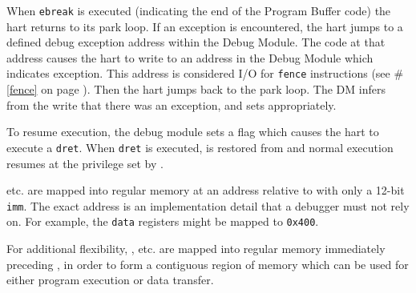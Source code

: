 When {\tt ebreak} is executed (indicating the end of the
Program Buffer code) the hart returns to its park loop. If an exception is
encountered, the hart jumps to a defined debug exception address within
the Debug Module. The code at that address causes the hart to
write to an address in the Debug Module which indicates exception.
This address is considered I/O for {\tt fence} instructions (see \#\ref{fence}
on page \pageref{fence}).
Then the hart jumps back to the park loop.
The DM infers from the write that there was an exception, and sets \Fcmderr appropriately.

To resume execution, the debug module sets a flag which causes the hart to execute a {\tt dret}.
When {\tt dret} is executed, \Rpc is restored from \Rdpc and normal execution resumes at the
privilege set by \Fprv.

\Rdatazero etc. are mapped into regular memory at an address relative to \Rzero
with only a 12-bit {\tt imm}. The exact address is an implementation
detail that a debugger must not rely on. For example, the {\tt data}
registers might be mapped to {\tt 0x400}.

For additional flexibility, \Rprogbufzero, etc. are mapped into regular memory
immediately preceding \Rdatazero, in order to form a contiguous region of memory which
can be used for either program execution or data transfer.
